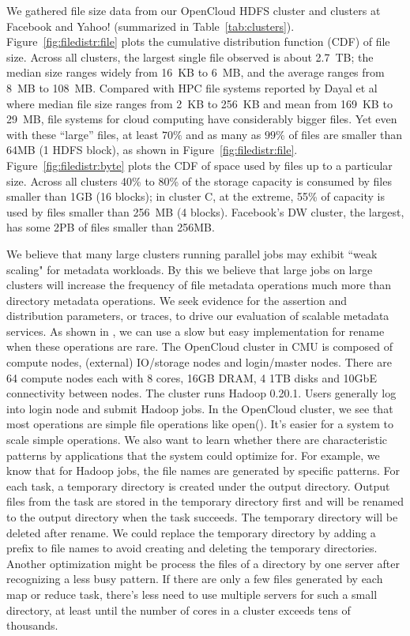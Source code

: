 We gathered file size  data
from our OpenCloud HDFS cluster and clusters at Facebook and Yahoo! (summarized in
Table~\ref{tab:clusters}).
Figure~\ref{fig:filedistr:file} plots the cumulative distribution function
(CDF) of file size.  Across all clusters, the largest single file
observed is about 2.7~TB; the median size ranges widely from 16~KB to 6~MB, and the average 
ranges from 8~MB to 108~MB. 
Compared with HPC file systems reported by Dayal et al \cite{Dayal08} where
 median file size ranges from 2~KB to 256~KB and mean from 169~KB to 29~MB,
file systems for cloud computing  have  considerably bigger files. 
Yet even with these ``large'' files, at least $70\%$ and as many as $99\%$ of
files are smaller than 64MB (1 HDFS block), as shown in Figure~\ref{fig:filedistr:file}.
Figure~\ref{fig:filedistr:byte} plots the CDF of space used by files up to a
particular size. 
Across all clusters 40\% to 80\% of the storage capacity
is consumed by files smaller than 1GB (16 blocks);
in cluster C, at the extreme,  55\% of  capacity is used by files smaller than
256~MB (4 blocks). Facebook's DW cluster, the largest, has some 2PB of files
smaller than 256MB. 



We believe that many large clusters running parallel jobs may exhibit ``weak scaling" for metadata workloads. By this we believe that large jobs on large clusters will increase the frequency of file metadata operations much more than directory metadata operations. We seek evidence for the assertion and distribution parameters, or traces, to drive our evaluation of scalable metadata services.
As shown in \cite{shafeeq2010}, we can use a slow but easy implementation for rename when these operations are rare. The OpenCloud cluster\cite{opencloud} in CMU is composed of compute nodes, (external) IO/storage nodes and login/master nodes. There are  64 compute nodes each with 8 cores, 16GB  DRAM, 4 1TB disks and 10GbE connectivity between nodes. The cluster runs Hadoop 0.20.1. 
Users generally log into login node and submit Hadoop jobs.
In the OpenCloud cluster, we see that most operations are simple file operations like open(). It's easier for a system to scale simple operations. 
We also want to learn whether there are characteristic patterns by applications that the system could optimize for. For example, we know that for Hadoop jobs, the file names are generated by specific patterns. For each task, a temporary directory is created under the output directory. Output files from the task are stored in the temporary directory first and  will be renamed to the output directory when the task succeeds. The temporary directory will be deleted after rename. 
We could replace the temporary directory by adding a prefix to file names to avoid creating and deleting the temporary directories. Another optimization might be process the files of a  directory by one server after recognizing a less busy pattern. 
If there are  only a few files generated by each map or reduce task, there's less need to use multiple servers for such a small directory, at least until the number of cores in a cluster exceeds tens of thousands.

